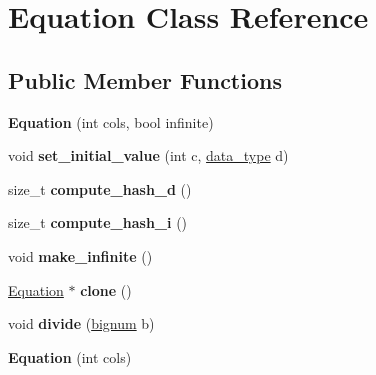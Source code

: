 \hypertarget{classEquation}{\section{\-Equation \-Class \-Reference}
\label{classEquation}
}
\subsection*{\-Public \-Member \-Functions}
\begin{DoxyCompactItemize}
\item 
\hypertarget{classEquation_a3d0b2d300421779d32991da6e75d8923}{{\bfseries \-Equation} (int cols, bool infinite)}\label{classEquation_a3d0b2d300421779d32991da6e75d8923}

\item 
\hypertarget{classEquation_a80df9d307bebd60b8df5aad3cde9b562}{void {\bfseries set\-\_\-initial\-\_\-value} (int c, \hyperlink{uniondata__type}{data\-\_\-type} d)}\label{classEquation_a80df9d307bebd60b8df5aad3cde9b562}

\item 
\hypertarget{classEquation_a5e1015cd498c3b66de2d0894f393f249}{size\-\_\-t {\bfseries compute\-\_\-hash\-\_\-d} ()}\label{classEquation_a5e1015cd498c3b66de2d0894f393f249}

\item 
\hypertarget{classEquation_a7001f49bc5c4988e6917c294589f8aa9}{size\-\_\-t {\bfseries compute\-\_\-hash\-\_\-i} ()}\label{classEquation_a7001f49bc5c4988e6917c294589f8aa9}

\item 
\hypertarget{classEquation_ad7116a9282cb349f9beb0b682a1b68bc}{void {\bfseries make\-\_\-infinite} ()}\label{classEquation_ad7116a9282cb349f9beb0b682a1b68bc}

\item 
\hypertarget{classEquation_a3c6502c0573d81abb203cf8856eb1dc1}{\hyperlink{classEquation}{\-Equation} $\ast$ {\bfseries clone} ()}\label{classEquation_a3c6502c0573d81abb203cf8856eb1dc1}

\item 
\hypertarget{classEquation_a582353148cbaaed08a132931033bab96}{void {\bfseries divide} (\hyperlink{classbignum}{bignum} b)}\label{classEquation_a582353148cbaaed08a132931033bab96}

\item 
\hypertarget{classEquation_a2ffaac9efb0d0f1190201a5da1625d23}{{\bfseries \-Equation} (int cols)}\label{classEquation_a2ffaac9efb0d0f1190201a5da1625d23}


\end{DoxyCompactItemize}
